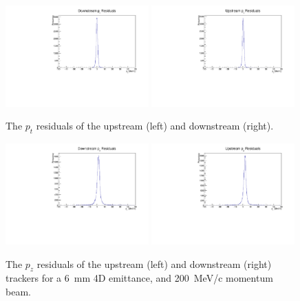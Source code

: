   
  \begin{figure}[p]
    \begin{center}
      \includegraphics[width=0.49\textwidth, angle=0]{08-Performance/downstream_residual_pt.pdf}
      \includegraphics[width=0.49\textwidth, angle=0]{08-Performance/upstream_residual_pt.pdf}
      \caption{\label{fig:PtResidKalman} The $p_t$ residuals of the upstream (left) and downstream (right).}
    \end{center}
  \end{figure}
  
   \begin{figure}[p]
    \begin{center}
      \includegraphics[width=0.49\textwidth, angle=0]{08-Performance/downstream_residual_pz.pdf}
      \includegraphics[width=0.49\textwidth, angle=0]{08-Performance/upstream_residual_pz.pdf}
      \caption{\label{fig:PzResidKalman} The $p_z$ residuals of the upstream (left) and downstream (right) trackers for a 6~mm 4D emittance, and 200~MeV/c momentum beam.}
    \end{center}
  \end{figure}
  
